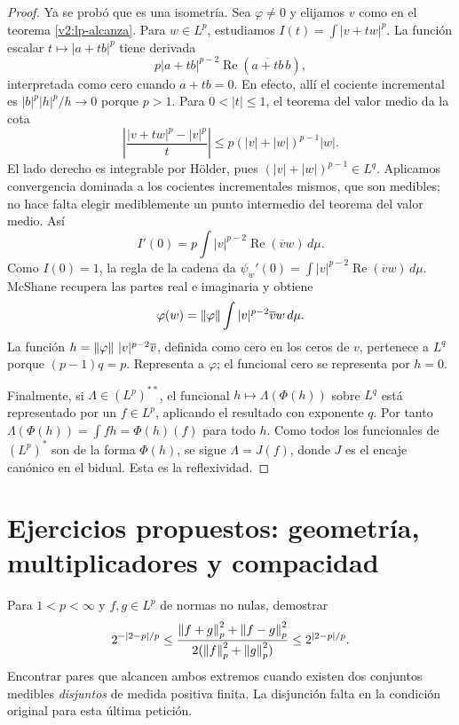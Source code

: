 \begin{proof}
Ya se probó que es una isometría. Sea $\varphi\ne0$ y elijamos $v$ como en el teorema \ref{v2:lp-alcanza}. Para $w\in L^p$, estudiamos $I(t)=\int|v+tw|^p$. La función escalar $t\mapsto|a+tb|^p$ tiene derivada
\[
 p|a+tb|^{p-2}\operatorname{Re}(\overline{a+tb}\,b),
\]
interpretada como cero cuando $a+tb=0$. En efecto, allí el cociente incremental es $|b|^p|h|^p/h\to0$ porque $p>1$. Para $0<|t|\le1$, el teorema del valor medio da la cota
\[
 \left|\frac{|v+tw|^p-|v|^p}{t}\right|
 \le p(|v|+|w|)^{p-1}|w|.
\]
El lado derecho es integrable por Hölder, pues $(|v|+|w|)^{p-1}\in L^q$. Aplicamos convergencia dominada a los cocientes incrementales mismos, que son medibles; no hace falta elegir mediblemente un punto intermedio del teorema del valor medio. Así
\[
 I'(0)=p\int|v|^{p-2}\operatorname{Re}(\overline v w)\,d\mu.
\]
Como $I(0)=1$, la regla de la cadena da
$\psi_w'(0)=\int|v|^{p-2}\operatorname{Re}(\overline v w)\,d\mu$.
McShane recupera las partes real e imaginaria y obtiene
\[
 \varphi(w)=\left\lVert\varphi\right\rVert\int |v|^{p-2}\overline v w\,d\mu.
\]
La función $h=\left\lVert\varphi\right\rVert\,|v|^{p-2}\overline v$, definida como cero en los ceros de $v$, pertenece a $L^q$ porque $(p-1)q=p$. Representa a $\varphi$; el funcional cero se representa por $h=0$.

Finalmente, si $\Lambda\in(L^p)^{**}$, el funcional $h\mapsto\Lambda(\Phi(h))$ sobre $L^q$ está representado por un $f\in L^p$, aplicando el resultado con exponente $q$. Por tanto $\Lambda(\Phi(h))=\int fh=\Phi(h)(f)$ para todo $h$. Como todos los funcionales de $(L^p)^*$ son de la forma $\Phi(h)$, se sigue $\Lambda=J(f)$, donde $J$ es el encaje canónico en el bidual. Esta es la reflexividad.
\end{proof}

\section{Ejercicios propuestos: geometría, multiplicadores y compacidad}
\begin{ejercicio}\label{ej:v2-l21-1}
Para $1<p<\infty$ y $f,g\in L^p$ de normas no nulas, demostrar
\[
 2^{-|2-p|/p}\le
 \frac{\left\lVert f+g\right\rVert_p^2+\left\lVert f-g\right\rVert_p^2}{2(\left\lVert f\right\rVert_p^2+\left\lVert g\right\rVert_p^2)}
 \le2^{|2-p|/p}.
\]
Encontrar pares que alcancen ambos extremos cuando existen dos conjuntos medibles \emph{disjuntos} de medida positiva finita. La disjunción falta en la condición original para esta última petición.
\end{ejercicio}

